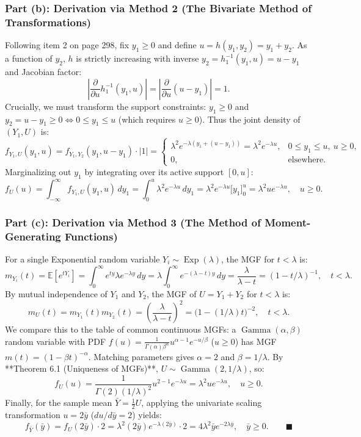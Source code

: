 \documentclass[11pt, letterpaper]{article}
\theoremstyle{definition}
\theoremstyle{remark}
\newcommand{\E}{\mathbb{E}}
\begin{document}
\subsubsection*{Part (b): Derivation via Method 2 (The Bivariate Method of Transformations)}
Following item 2 on page 298, fix $y_1 \ge 0$ and define $u = h(y_1, y_2) = y_1 + y_2$. As a function of $y_2$, $h$ is strictly increasing with inverse $y_2 = h_1^{-1}(y_1, u) = u - y_1$ and Jacobian factor:
\[
    \left|\frac{\partial}{\partial u} h_1^{-1}(y_1, u)\right| = \left|\frac{\partial}{\partial u}(u - y_1)\right| = 1.
\]
Crucially, we must transform the support constraints: $y_1 \ge 0$ and $y_2 = u - y_1 \ge 0 \iff 0 \le y_1 \le u$ (which requires $u \ge 0$). Thus the joint density of $(Y_1, U)$ is:
\[
    f_{Y_1, U}(y_1, u) = f_{Y_1, Y_2}(y_1, u - y_1) \cdot |1| = \begin{cases}
        \lambda^2 e^{-\lambda(y_1 + (u - y_1))} = \lambda^2 e^{-\lambda u}, & 0 \le y_1 \le u, \ u \ge 0, \\
        0, & \text{elsewhere.}
    \end{cases}
\]
Marginalizing out $y_1$ by integrating over its active support $[0, u]$:
\[
    f_U(u) = \int_{-\infty}^{\infty} f_{Y_1, U}(y_1, u) \, dy_1 = \int_0^u \lambda^2 e^{-\lambda u} \, dy_1 = \lambda^2 e^{-\lambda u} \Big[y_1\Big]_0^u = \lambda^2 u e^{-\lambda u}, \quad u \ge 0.
\]

\subsubsection*{Part (c): Derivation via Method 3 (The Method of Moment-Generating Functions)}
For a single Exponential random variable $Y_i \sim \operatorname{Exp}(\lambda)$, the MGF for $t < \lambda$ is:
\[
    m_{Y_i}(t) = \E[e^{t Y_i}] = \int_0^{\infty} e^{ty} \lambda e^{-\lambda y} \, dy = \lambda \int_0^{\infty} e^{-(\lambda - t)y} \, dy = \frac{\lambda}{\lambda - t} = (1 - t/\lambda)^{-1}, \quad t < \lambda.
\]
By mutual independence of $Y_1$ and $Y_2$, the MGF of $U = Y_1 + Y_2$ for $t < \lambda$ is:
\[
    m_U(t) = m_{Y_1}(t) m_{Y_2}(t) = \left(\frac{\lambda}{\lambda - t}\right)^2 = \big(1 - (1/\lambda)t\big)^{-2}, \quad t < \lambda.
\]
We compare this to the table of common continuous MGFs: a $\operatorname{Gamma}(\alpha, \beta)$ random variable with PDF $f(u) = \frac{1}{\Gamma(\alpha)\beta^\alpha} u^{\alpha - 1} e^{-u/\beta}$ ($u \ge 0$) has MGF $m(t) = (1 - \beta t)^{-\alpha}$. Matching parameters gives $\alpha = 2$ and $\beta = 1/\lambda$. By **Theorem 6.1 (Uniqueness of MGFs)**, $U \sim \operatorname{Gamma}(2, 1/\lambda)$, so:
\[
    f_U(u) = \frac{1}{\Gamma(2)(1/\lambda)^2} u^{2-1} e^{-\lambda u} = \lambda^2 u e^{-\lambda u}, \quad u \ge 0.
\]
Finally, for the sample mean $\bar{Y} = \frac{1}{2}U$, applying the univariate scaling transformation $u = 2\bar{y}$ ($du/d\bar{y} = 2$) yields:
\[
    f_{\bar{Y}}(\bar{y}) = f_U(2\bar{y}) \cdot 2 = \lambda^2 (2\bar{y}) e^{-\lambda(2\bar{y})} \cdot 2 = 4\lambda^2 \bar{y} e^{-2\lambda \bar{y}}, \quad \bar{y} \ge 0. \qquad \blacksquare
\]
\end{document}
